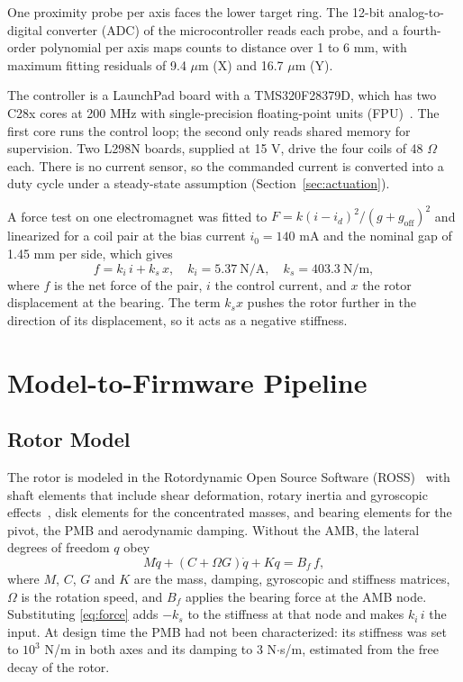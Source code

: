 \documentclass[conference]{IEEEtran}
\begin{document}
One proximity probe per axis faces the lower target ring. The 12-bit analog-to-digital converter (ADC) of the microcontroller reads each probe, and a fourth-order polynomial per axis maps counts to distance over 1 to 6 mm, with maximum fitting residuals of 9.4 $\mu$m (X) and 16.7 $\mu$m (Y).

The controller is a LaunchPad board with a TMS320F28379D, which has two C28x cores at 200 MHz with single-precision floating-point units (FPU)~\cite{ti2024f2837xd}. The first core runs the control loop; the second only reads shared memory for supervision. Two L298N boards, supplied at 15 V, drive the four coils of 48 $\Omega$ each. There is no current sensor, so the commanded current is converted into a duty cycle under a steady-state assumption (Section~\ref{sec:actuation}).

A force test on one electromagnet was fitted to $F = k(i - i_d)^2/(g + g_\text{off})^2$ and linearized for a coil pair at the bias current $i_0 = 140$ mA and the nominal gap of 1.45 mm per side, which gives
\begin{equation}
f = k_i\, i + k_s\, x, \quad k_i = 5.37~\text{N/A}, \quad k_s = 403.3~\text{N/m}, \label{eq:force}
\end{equation}
where $f$ is the net force of the pair, $i$ the control current, and $x$ the rotor displacement at the bearing. The term $k_s x$ pushes the rotor further in the direction of its displacement, so it acts as a negative stiffness.

\section{Model-to-Firmware Pipeline}\label{sec:pipeline}

\subsection{Rotor Model}

The rotor is modeled in the Rotordynamic Open Source Software (ROSS)~\cite{timbo2020ross} with shaft elements that include shear deformation, rotary inertia and gyroscopic effects~\cite{friswell2010dynamics}, disk elements for the concentrated masses, and bearing elements for the pivot, the PMB and aerodynamic damping. Without the AMB, the lateral degrees of freedom $q$ obey
\begin{equation}
M\ddot{q} + (C + \Omega G)\dot{q} + K q = B_f\, f, \label{eq:fe}
\end{equation}
where $M$, $C$, $G$ and $K$ are the mass, damping, gyroscopic and stiffness matrices, $\Omega$ is the rotation speed, and $B_f$ applies the bearing force at the AMB node. Substituting \eqref{eq:force} adds $-k_s$ to the stiffness at that node and makes $k_i\,i$ the input. At design time the PMB had not been characterized: its stiffness was set to $10^3$ N/m in both axes and its damping to 3 N$\cdot$s/m, estimated from the free decay of the rotor.
\end{document}

